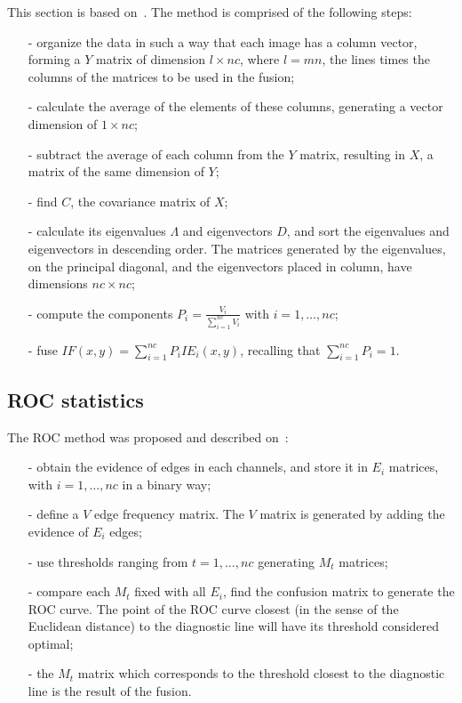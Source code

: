 \documentclass[journal]{IEEEtran}
\begin{document}
This section is based on~\cite{n_r,mit}.
The method is comprised of the following steps:
\begin{itemize}
\item[-] organize the data in such a way that each image has a column vector, forming a $Y$ matrix of dimension $l\times nc$, where $l=m n$, the lines times the columns of the matrices to be used in the fusion;
\item[-] calculate the average of the elements of these columns, generating a vector dimension of $1\times nc$;
\item[-] subtract the average of each column from the $Y$ matrix, resulting in $X$, a matrix of the same dimension of $Y$; 
\item[-] find $C$, the covariance matrix of $X$;
\item[-] calculate its eigenvalues $\Lambda$ and eigenvectors $D$, and sort the eigenvalues and eigenvectors in descending order. The matrices generated by the eigenvalues, on the principal diagonal, and the eigenvectors placed in column, have dimensions $nc\times nc$;
\item[-] compute the components $P_i=\frac{V_i}{\sum_{i=1}^{nc} V_i}$ with $i=1,\dots,nc$;
\item[-] fuse $IF(x,y)=\sum_{i=1}^{nc}P_iIE_i(x,y)$, recalling that $\sum_{i=1}^{nc}P_i=1$.
\end{itemize}

\subsection{ROC statistics}

The ROC method was proposed and described on~\cite{gs,fawcett}:
\begin{itemize}
\item[-] obtain the evidence of edges in each channels, and store it in $E_i$ matrices, with $i=1,\dots,nc$ in a binary way;
\item[-] define a $V$ edge frequency matrix. The $V$ matrix is generated by adding the evidence of $E_i$ edges;
\item[-] use thresholds ranging from $t=1,\dots,nc$ generating $M_t$ matrices;
\item[-] compare each $M_t$ fixed with all $E_i$, find the confusion matrix to generate the ROC curve. The point of the ROC curve closest (in the sense of the Euclidean distance) to the diagnostic line will have its threshold considered optimal;
\item[-] the $M_t$ matrix which corresponds to the threshold closest to the diagnostic line is the result of the fusion.
\end{itemize}
\end{document}
